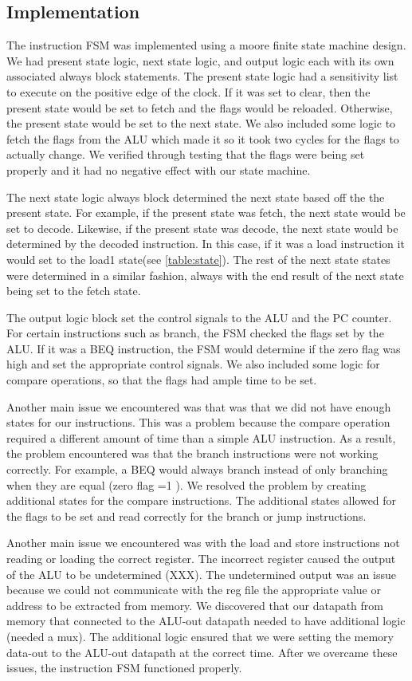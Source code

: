\documentclass[11pt]{article}
\begin{document}
\subsection{Implementation}
The instruction FSM was implemented using a moore finite state machine design. We had present state logic, next state logic, and output logic each with its own associated always block statements. The present state logic had a sensitivity list to execute on the positive edge of the clock. If it was set to clear, then the present state would be set to fetch and the flags would be reloaded. Otherwise, the present state would be set to the next state. We also included some logic to fetch the flags from the ALU which made it so it took two cycles for the flags to actually change. We verified through testing that the flags were being set properly and it had no negative effect with our state machine. 

The next state logic always block determined the next state based off the the present state. For example, if the present state was fetch, the next state would be set to decode. Likewise, if the present state was decode, the next state would be determined by the decoded instruction. In this case, if it was a load instruction it would set to the load1 state(see \ref{table:state}). The rest of the next state states were determined in a similar fashion, always with the end result of the next state being set to the fetch state. 

The output logic block set the control signals to the ALU and the PC counter. For certain instructions such as branch, the FSM checked the flags set by the ALU. If it was a BEQ instruction, the FSM would determine if the zero flag was high and set the appropriate control signals. We also included some logic for compare operations, so that the flags had ample time to be set.
 

Another main issue we encountered was that was that we did not have enough states for our instructions. This was a problem because the compare operation required a different amount of time than a simple ALU instruction. As a result, the problem encountered was that the branch instructions were not working correctly. For example, a BEQ would always branch instead of only branching when they are equal (zero flag =1 ). We resolved the problem by creating additional states for the compare instructions. The additional states allowed for the flags to be set and read correctly for the branch or jump instructions. 

Another main issue we encountered was with the load and store instructions not reading or loading the correct register. The incorrect register caused the output of the ALU to be undetermined (XXX). The undetermined output was an issue because we could not communicate with the reg file the appropriate value or address to be extracted from memory. We discovered that our datapath from memory that connected to the ALU-out datapath needed to have additional logic (needed a mux). The additional logic ensured that we were setting the memory data-out to the ALU-out datapath at the correct time. After we overcame these issues, the instruction FSM functioned properly.
\end{document}
